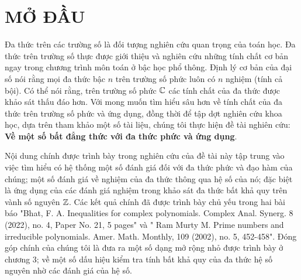 \documentclass[a5paper,12pt]{report}
\theoremstyle{definition}
\numberwithin{equation}{chapter}
\begin{document}
	\begin{parcolumns}[colwidths={1=.2\textwidth},rulebetween=false]{2}
	\end{parcolumns}
	
	
	
	\chapter*{MỞ ĐẦU}
	
	Đa thức trên các trường số là đối tượng nghiên cứu quan trọng của toán học. Đa thức trên trường số thực được giới thiệu và nghiên cứu những tính chất cơ bản ngay trong chương trình môn toán ở bậc học phổ thông. Định lý cơ bản của đại số nói rằng mọi đa thức bậc $n$ trên trường số phức luôn có $n$ nghiệm (tính cả bội). Có thể nói rằng, trên trường số phức $\Bbb C$ các tính chất của đa thức được khảo sát thấu đáo hơn. Với mong muốn tìm hiểu sâu hơn về tính chất của đa thức trên trường số phức và ứng dụng, đồng thời để tập dợt nghiên cứu khoa học, dựa trên tham khảo một số tài liệu, chúng tôi thực hiện đề tài nghiên cứu: {\bf  Về một số bất đẳng thức với đa thức phức và ứng dụng}. 
	\par Nội dung chính được trình bày trong nghiên cứu của đề tài này tập trung vào việc tìm hiểu có hệ thống một số đánh giá đối với đa thức phức và đạo hàm của chúng; một số đánh giá về nghiệm của đa thức thông qua hệ số của nó; đặc biệt là ứng dụng của các đánh giá nghiệm trong khảo sát đa thức bất khả quy trên vành số nguyên $\Bbb Z$. Các kết quả chính đã được trình bày  chủ yếu trong hai bài báo  "Bhat, F. A. Inequalities for complex polynomials. Complex Anal. Synerg. 8 (2022), no. 4, Paper No. 21, 5 pages"  và " Ram Murty M. Prime numbers and irreducible polynomials. Amer. Math. Monthly, 109 (2002), no. 5, 452-458". Đóng góp chính của chúng tôi là đưa ra một số dạng mở rộng nhỏ được trình bày ở chương 3; về một số dấu hiệu kiểm tra tính bất khả quy của đa thức hệ số nguyên nhờ các đánh giá của hệ số.
	
\end{document}
